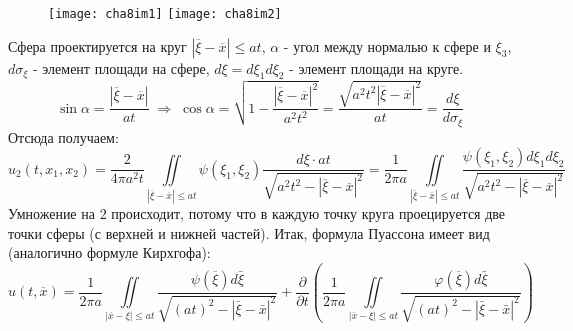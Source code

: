 \begin{Proof}
\begin{figure}[h]
	\begin{multicols}{2}
		\texttt{[image: cha8im1]}
		\columnbreak
		\texttt{[image: cha8im2]}
	\end{multicols}
\end{figure}
Сфера проектируется на круг $|\overline{\xi}-\overline{x}|\le at$, $\alpha$ - угол между нормалью к сфере и $\xi_3$, $d \sigma_{\xi}$ - элемент площади на сфере, $d\xi = d\xi_1 d\xi_2$ - элемент площади на круге.
$$\sin{\alpha} = \frac{|\overline{\xi}-\overline{x}|}{a t} \; \Rightarrow \; \cos{\alpha} = \sqrt{1 - \frac{|\overline{\xi}-\overline{x}|^2}{a^2 t^2}} = \frac{\sqrt{a^2t^2|\overline{\xi}-\overline{x}|^2}}{a t} = \frac{d\xi}{d \sigma_{\xi}}$$
Отсюда получаем:
$$u_2 (t, x_1, x_2) = \frac{2}{4\pi a^2 t} \underset{|\overline{\xi}-\overline{x}|\le at}{\overset{}{\iint}}\psi (\xi_1, \xi_2) \frac{d\xi \cdot at}{\sqrt{a^2t^2 - |\overline{\xi}-\overline{x}|^2}} = \frac{1}{2\pi a}\underset{|\overline{\xi}-\overline{x}|\le at}{\overset{}{\iint}} \frac{\psi (\xi_1, \xi_2) d\xi_1 d\xi_2}{\sqrt{a^2t^2 - |\overline{\xi}-\overline{x}|^2}}$$
Умножение на $2$ происходит, потому что в каждую точку круга проецируется две точки сферы (с верхней и нижней частей). Итак, формула Пуассона имеет вид (аналогично формуле Кирхгофа):
$$u(t, \overline{x}) = \frac{1}{2 \pi a} \underset{|\overline{x} - \xi| \leq at}{\overset{}{\iint}} \dfrac{\psi (\overline{\xi}) d \bar{\xi} }{\sqrt{(at)^2 - |\bar{\xi} - \bar{x}|^2}} + \frac{\partial}{\partial t} (\frac{1}{2 \pi a} \underset{|\overline{x} - \xi| \leq at}{\overset{}{\iint}} \dfrac{\varphi (\overline{\xi}) d \bar{\xi} }{\sqrt{(at)^2 - |\bar{\xi} - \bar{x}|^2}}) $$



















\end{Proof}
